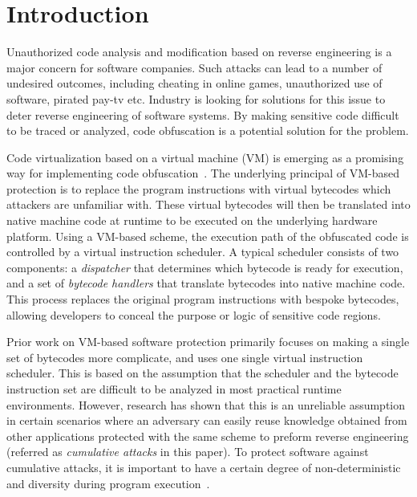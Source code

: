 \section{Introduction}
Unauthorized code analysis and modification based on reverse engineering is a major concern for software companies.
Such attacks can lead to a number of undesired outcomes,
including cheating in online games, unauthorized use of software, pirated pay-tv etc.
Industry is looking for solutions for this issue to deter reverse engineering of software systems.
By making sensitive code difficult to be traced or analyzed, code obfuscation is a potential solution for the problem.

Code virtualization based on a virtual machine (VM) is emerging as a
promising way for implementing code
obfuscation~\cite{1Themida,2CV,3Vmprotect,5fang2011multi,6ming2011software,7wang2014tdvmp,8wang2013nislvmp}.
The underlying principal of VM-based protection is to replace the program
instructions with virtual bytecodes which attackers are unfamiliar with.
These virtual bytecodes will then be translated into native machine code at
runtime to be executed on the underlying hardware platform. Using a VM-based
scheme, the execution path of the obfuscated code is controlled by a virtual
instruction scheduler. A typical scheduler consists of two components: a
\emph{dispatcher} that determines which bytecode is ready for execution, and
a set of \emph{bytecode handlers} that translate bytecodes into native
machine code. This process replaces the original program instructions with
bespoke bytecodes, allowing developers to conceal the purpose or logic of
sensitive code regions.

Prior work on VM-based software protection primarily focuses on making a
single set of bytecodes more complicate, and uses one single virtual
instruction scheduler. This is based on the assumption that the scheduler and
the bytecode instruction set are difficult to be analyzed in most practical
runtime environments. However, research has shown that this is an unreliable
assumption~\cite{10falliere2009inside} in certain scenarios where an
adversary can easily reuse knowledge obtained from other applications
protected with the same scheme to preform reverse engineering (referred as
\emph{cumulative attacks} in this paper). To protect software against
cumulative attacks, it is important to have a certain degree of non-deterministic
and diversity during program execution~\cite{4collberg}.

